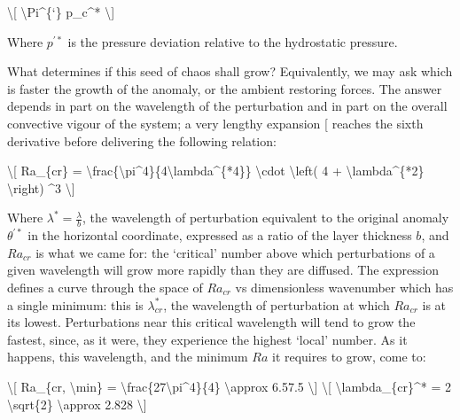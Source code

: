 \documentclass[letterpaper,10pt,english]{jupyterBook}
\begin{document}
\sphinxAtStartPar
\textbackslash{}{[} \textbackslash{}Pi\textasciicircum{}\{‘\} \sphinxhyphen{} p\_c\textasciicircum{}* \textbackslash{}{]}

\sphinxAtStartPar
Where \(p^{'*}\) is the pressure deviation relative to the hydrostatic pressure.

\sphinxAtStartPar
What determines if this seed of chaos shall grow? Equivalently, we may ask which is faster \sphinxhyphen{} the growth of the anomaly, or the ambient restoring forces. The answer depends in part on the wavelength of the perturbation and in part on the overall convective vigour of the system; a very lengthy expansion {[}\sphinxcite{references:id89}{]} reaches the sixth derivative before delivering the following relation:

\sphinxAtStartPar
\textbackslash{}{[} Ra\_\{cr\} = \textbackslash{}frac\{\textbackslash{}pi\textasciicircum{}4\}\{4\textbackslash{}lambda\textasciicircum{}\{*4\}\} \textbackslash{}cdot \textbackslash{}left( 4 + \textbackslash{}lambda\textasciicircum{}\{*2\} \textbackslash{}right) \textasciicircum{}3 \textbackslash{}{]}

\sphinxAtStartPar
Where \(\lambda^*=\frac{\lambda}{b}\), the wavelength of perturbation equivalent to the original anomaly \(\theta^{'*}\) in the horizontal coordinate, expressed as a ratio of the layer thickness \(b\), and \(Ra_{cr}\) is what we came for: the ‘critical’  number above which perturbations of a given wavelength will grow more rapidly than they are diffused. The expression defines a curve through the space of \(Ra_{cr}\) vs dimensionless wavenumber which has a single minimum: this is \(\lambda^*_{cr}\), the wavelength of perturbation at which \(Ra_{cr}\) is at its lowest. Perturbations near this critical wavelength will tend to grow the fastest, since, as it were, they experience the highest ‘local’  number. As it happens, this wavelength, and the minimum \(Ra\) it requires to grow, come to:

\sphinxAtStartPar
\textbackslash{}{[} Ra\_\{cr, \textbackslash{}min\} = \textbackslash{}frac\{27\textbackslash{}pi\textasciicircum{}4\}\{4\} \textbackslash{}approx 6.57.5 \textbackslash{}{]}
\textbackslash{}{[} \textbackslash{}lambda\_\{cr\}\textasciicircum{}* = 2 \textbackslash{}sqrt\{2\} \textbackslash{}approx 2.828 \textbackslash{}{]}
\end{document}
